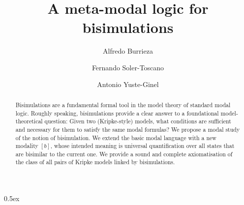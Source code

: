 \documentclass[11pt,a4paper]{article}
\begin{document}
\title{A meta-modal logic for bisimulations}
\author{Alfredo Burrieza \and Fernando Soler-Toscano \and Antonio Yuste-Ginel}

\maketitle

\begin{abstract}
  Bisimulations are a fundamental formal tool in the model theory of
  standard modal logic. Roughly speaking, bisimulations provide a
  clear answer to a foundational model-theoretical question: Given two
  (Kripke-style) models, what conditions are sufficient and necessary
  for them to satisfy the same modal formulas?  We propose a modal
  study of the notion of bisimulation. We extend the basic modal
  language with a new modality $[b]$, whose intended meaning is
  universal quantification over all states that are bisimilar to the
  current one. We provide a sound and complete axiomatisation of the
  class of all pairs of Kripke models linked by bisimulations.
\end{abstract}

\tableofcontents

\parindent 0pt\parskip 0.5ex

{\medskip}





\end{document}
